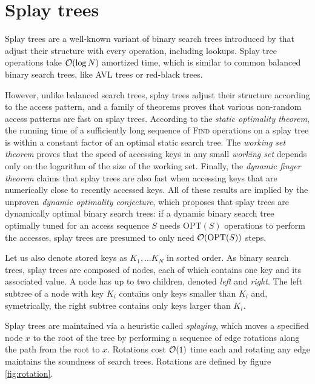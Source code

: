 \chapter{Splay trees}
\label{chapter:splay}
Splay trees are a well-known variant of binary search trees introduced
by \cite{splay} that adjust their structure with every operation, including
lookups. Splay tree operations take $\mathcal{O}(\log N)$ amortized time, which is
similar to common balanced binary search trees, like AVL trees or
red-black trees.

However, unlike balanced search trees, splay trees adjust their structure
according to the access pattern, and a family of theorems proves that
various non-random access patterns are fast on splay trees.
According to the \textit{static optimality theorem}, the running time
of a sufficiently long sequence of \textsc{Find} operations on a splay tree
is within a constant factor of an optimal static search tree.
The \textit{working set theorem} proves that the speed of accessing keys in
any small \textit{working set} depends only on the logarithm of the size
of the working set.
Finally, the \textit{dynamic finger theorem} claims that splay trees are also
fast when accessing keys that are numerically close to recently accessed keys.
All of these results are implied by the unproven \textit{dynamic optimality
conjecture}, which proposes that splay trees are dynamically optimal binary
search trees: if a dynamic binary search tree optimally tuned for an access
sequence $S$ needs $\mathrm{OPT}(S)$ operations to perform the accesses, splay
trees are presumed to only need $\mathcal{O}(\mathrm{OPT}(S))$ steps.

Let us also denote stored keys as $K_1,\ldots K_N$ in sorted order.
As binary search trees, splay trees are composed of nodes, each of which
contains one key and its associated value. A node has up to two children,
denoted \textit{left} and \textit{right}.
The left subtree of a node with key $K_i$ contains only keys smaller than $K_i$
and, symetrically, the right subtree contains only keys larger than $K_i$.

Splay trees are maintained via a heuristic called \textit{splaying}, which
moves a specified node $x$ to the root of the tree by performing a sequence
of edge rotations along the path from the root to $x$.
Rotations cost $\mathcal{O}(1)$ time each and rotating any edge maintains
the soundness of search trees. Rotations are defined by figure
\ref{fig:rotation}.

\newcommand{\hunk}[2]{ node [splay_hunk] (hunk#1-#2) {#1} }

